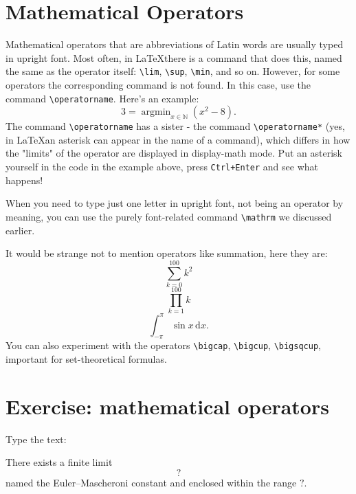 \section{Mathematical Operators}
\par Mathematical operators that are abbreviations of Latin words are usually typed in upright font. Most often, in \LaTeX there is a command that does this, named the same as the operator itself: \verb"\lim", \verb"\sup", \verb"\min", and so on. However, for some operators the corresponding command is not found. In this case, use the command \verb"\operatorname".\index{\operatorname} Here's an example: \[3=\operatorname{argmin}_{x\in\mathbb{N}}(x^2-8).\] The command \verb"\operatorname" has a sister - the command \verb"\operatorname*" (yes, in \LaTeX an asterisk can appear in the name of a command), which differs in how the "limits" of the operator are displayed in display-math mode. Put an asterisk yourself in the code in the example above, press \verb"Ctrl+Enter" and see what happens!
\par When you need to type just one letter in upright font, not being an operator by meaning, you can use the purely font-related command \verb"\mathrm" we discussed earlier.\index{\mathrm}
\par It would be strange not to mention operators like summation, here they are:
\[\sum_{k=0}^{100} k^2\]
\[\prod_{k=1}^{100} k\]
\[\int_{-\pi}^\pi\sin x\,\mathrm{d}x.\]
You can also experiment with the operators \verb"\bigcap", \verb"\bigcup", \verb"\bigsqcup", important for set-theoretical formulas.

\section{Exercise: mathematical operators}
\begin{staticpart}
Type the text: 
\end{staticpart}
\par There exists a finite limit \[?\] named the Euler–Mascheroni constant and enclosed within the range \(?\).

